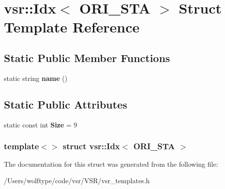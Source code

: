 \hypertarget{structvsr_1_1_idx_3_01_o_r_i___s_t_a_01_4}{\section{vsr\-:\-:Idx$<$ O\-R\-I\-\_\-\-S\-T\-A $>$ Struct Template Reference}
\label{structvsr_1_1_idx_3_01_o_r_i___s_t_a_01_4}
}
\subsection*{Static Public Member Functions}
\begin{DoxyCompactItemize}
\item 
\hypertarget{structvsr_1_1_idx_3_01_o_r_i___s_t_a_01_4_a048028f637287a32bf24d1a5b6d14814}{static string {\bfseries name} ()}\label{structvsr_1_1_idx_3_01_o_r_i___s_t_a_01_4_a048028f637287a32bf24d1a5b6d14814}

\end{DoxyCompactItemize}
\subsection*{Static Public Attributes}
\begin{DoxyCompactItemize}
\item 
\hypertarget{structvsr_1_1_idx_3_01_o_r_i___s_t_a_01_4_ad549e1cce0c2bbed691bee1e82b8cf4c}{static const int {\bfseries Size} = 9}\label{structvsr_1_1_idx_3_01_o_r_i___s_t_a_01_4_ad549e1cce0c2bbed691bee1e82b8cf4c}

\end{DoxyCompactItemize}
\subsubsection*{template$<$$>$ struct vsr\-::\-Idx$<$ O\-R\-I\-\_\-\-S\-T\-A $>$}



The documentation for this struct was generated from the following file\-:\begin{DoxyCompactItemize}
\item 
/\-Users/wolftype/code/vsr/\-V\-S\-R/vsr\-\_\-templates.\-h\end{DoxyCompactItemize}
